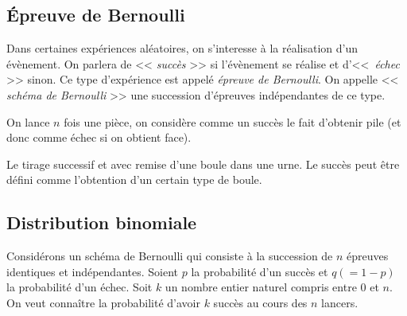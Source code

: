                  \subsection{\'Epreuve de Bernoulli}
                        Dans certaines exp\'eriences al\'eatoires, 
                        on s'interesse \`a la r\'ealisation d'un \'ev\`enement.
                        On parlera de << \emph{succ\`es} >> si l'\'ev\`enement se r\'ealise
                        et d'<<~\emph{\'echec} >> sinon.
                        Ce type d'exp\'erience est appel\'e \emph{\'epreuve de Bernoulli}.
                        On appelle << \emph{sch\'ema de Bernoulli} >> une succession d'\'epreuves ind\'ependantes de ce type.
                        \begin{ex}
                              On lance $n$ fois une pi\`ece,
                              on consid\`ere comme un succ\`es le fait d'obtenir pile
                              (et donc comme \'echec si on obtient face).
                              
                              Le tirage successif et avec remise d'une boule dans une urne.
                              Le succ\`es peut \^etre d\'efini comme l'obtention d'un certain type de boule.
                        \end{ex}
                  \subsection{Distribution binomiale}
                        Consid\'erons un sch\'ema de Bernoulli qui 
                        consiste \`a la succession de $n$ \'epreuves identiques et ind\'ependantes.
                        Soient $p$ la probabilit\'e d'un succ\`es et $q ( = 1-p)$ la probabilit\'e d'un \'echec.
                        Soit $k$ un nombre entier naturel compris entre $0$ et $n$.
                        On veut conna\^itre la probabilit\'e d'avoir $k$ succ\`es au cours des $n$ lancers.
                        
